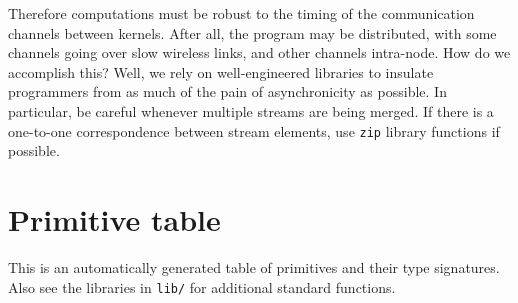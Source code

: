 \documentclass[twocolumn]{report}
\newcommand{\rednote}[1]{{\textcolor{blue}{#1}}}
\newcommand{\cde}{\tt}
\begin{document}


Therefore computations must be robust to the timing of the
communication channels between kernels.  After all, the program may be
distributed, with some channels going over slow wireless links, and
other channels intra-node.  How do we accomplish this?  Well, we rely
on well-engineered libraries to insulate programmers from as much of
the pain of asynchronicity as possible.  In particular, be careful
whenever multiple streams are being merged.  If there is a one-to-one
correspondence between stream elements, use {\cde zip} library
functions if possible.





\appendix
\chapter{Primitive table}\label{s:primtable}

This is an automatically generated table of primitives and their type
signatures.  Also see the libraries in {\cde lib/} for
additional standard functions.

{
\scriptsize

}



\end{document}
